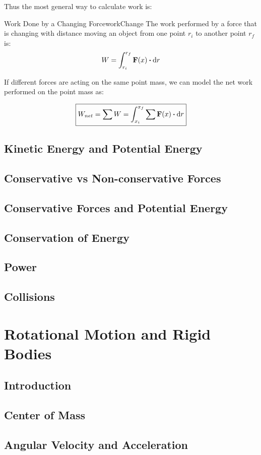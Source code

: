 \documentclass{report}
\begin{document}
Thus the most general way to calculate work is:

\begin{mytheo}{Work Done by a Changing Force}{workChange}
    The work performed by a force that is changing with distance moving an object from one point $r_i$ to another point $r_f$  is:
    $$W = \int_{r_i}^{r_f} \mathbf{F}(x)\vdot \dd r$$
    
\end{mytheo}
If different forces are acting on the same point mass, we can model the net work performed on the point mass as:


$$ \boxed{
W_{net} = \sum W = \int_{x_i}^{x_f}\sum \mathbf{ F}(x)\vdot \dd r}
$$




\section{Kinetic Energy and Potential Energy}
\section{Conservative vs Non-conservative Forces}
\section{Conservative Forces and Potential Energy}
\section{Conservation of Energy}
\section{Power}
\section{Collisions}


\chapter{Rotational Motion and Rigid Bodies}
\section{Introduction}
\section{Center of Mass}
\section{Angular Velocity and Acceleration}
\end{document}
